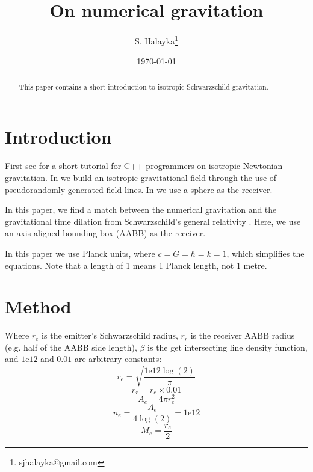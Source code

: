 \documentclass[12pt]{article}
\title{On numerical gravitation}
\author{S. Halayka\footnote{sjhalayka@gmail.com}}
\date{\today\;\currenttime}
\begin{document}
 
\maketitle

\begin{abstract}
This paper contains a short introduction to isotropic Schwarzschild gravitation.
\end{abstract}




\section{Introduction}

First see \cite{halayka} for a short tutorial for C++ programmers on isotropic Newtonian gravitation.
In \cite{halayka} we build an isotropic gravitational field through the use of pseudorandomly generated field lines.
In \cite{halayka} we use a sphere as the receiver.

In this paper, we find a match between the numerical gravitation and the gravitational time dilation from Schwarzschild's general relativity \cite{hooft, susskind, misner}.
Here, we use an axis-aligned bounding box (AABB) as the receiver.

In this paper we use Planck units, where $c = G = \hbar = k = 1$, which simplifies the equations.
Note that a length of 1 means 1 Planck length, not 1 metre.


\section{Method}

Where $r_{e}$ is the emitter's Schwarzschild radius, $r_{r}$ is the receiver AABB radius (e.g. half of the AABB side length), $\beta$ is the get intersecting line density function, and $1\mathrm{e}12$ and $0.01$ are arbitrary constants:
\begin{equation}
r_{e} = \sqrt{\frac{1\mathrm{e}12 \log(2)}{\pi}}
\end{equation}
\begin{equation}
r_{r} = r_{e} \times 0.01
\end{equation}
\begin{equation}
A_{e} = 4 \pi r_{e}^2
\end{equation}
\begin{equation}
n_{e} = \frac{A_{e}}{4 \log(2)} = 1\mathrm{e}12
\end{equation}
\begin{equation}
M_{e} = \frac{r_{e}}{2}
\end{equation}
\end{document}
